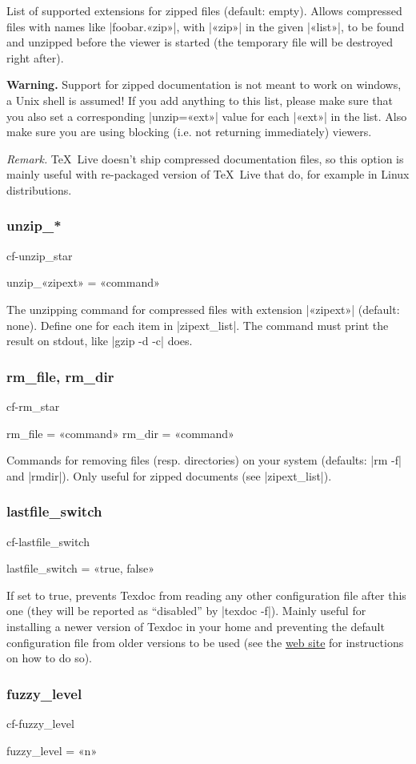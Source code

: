 \documentclass[a4paper, oneside]{scrartcl}
\newcommand\texlive{\TeX~Live\xspace}
\newif\ifframed
\newenvironment{cmdsubsub}[2]{%
  \framedfalse \commandes\subsubsection{#1}{#2}%
  }{%
  \endcommandes}
\begin{document}
List of supported extensions for zipped files (default: empty).  Allows
compressed files with names like |foobar.«zip»|, with |«zip»| in the given
|«list»|, to be found and unzipped before the viewer is started (the
temporary file will be destroyed right after).

\textbf{Warning.} Support for zipped documentation is not meant to work on
windows, a Unix shell is assumed! If you add anything to this list, please
make sure that you also set a corresponding |unzip=«ext»| value for each
|«ext»| in the list. Also make sure you are using blocking (i.e. not returning
immediately) viewers.

\textit{Remark.} \texlive doesn't ship compressed documentation files, so
this option is mainly useful with re-packaged version of \texlive that do,
for example in Linux distributions.

\begin{cmdsubsub}{unzip_*}{cf-unzip_star}
  unzip_«zipext» = «command»
\end{cmdsubsub}

The unzipping command for compressed files with extension |«zipext»| (default:
none). Define one for each item in |zipext_list|. The command must print
the result on stdout, like |gzip -d -c| does.

\begin{cmdsubsub}{rm_file, rm_dir}{cf-rm_star}
  rm_file = «command»
  rm_dir  = «command»
\end{cmdsubsub}

Commands for removing files (resp. directories) on your system (defaults:
|rm -f| and |rmdir|). Only useful for zipped documents (see |zipext_list|).

\begin{cmdsubsub}{lastfile_switch}{cf-lastfile_switch}
  lastfile_switch = «true, false»
\end{cmdsubsub}

If set to true, prevents Texdoc from reading any other configuration file
after this one (they will be reported as ``disabled'' by |texdoc -f|).  Mainly
useful for installing a newer version of Texdoc in your home and preventing
the default configuration file from older versions to be used (see the
\href{https://tug.org/texdoc/}{web site} for instructions on how to do so).

\begin{cmdsubsub}{fuzzy_level}{cf-fuzzy_level}
  fuzzy_level = «n»
\end{cmdsubsub}
\end{document}

